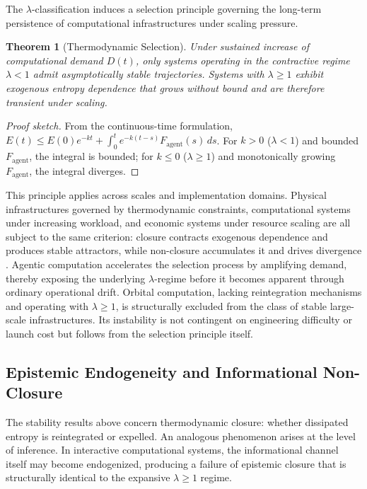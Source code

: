 \documentclass[11pt,a4paper]{article}
\theoremstyle{plain}
\newtheorem{theorem}{Theorem}
\theoremstyle{definition}
\theoremstyle{remark}
\begin{document}
The $\lambda$-classification induces a selection principle governing the
long-term persistence of computational infrastructures under scaling pressure.

\begin{theorem}[Thermodynamic Selection]
\label{thm:selection2}
Under sustained increase of computational demand $D(t)$, only systems operating
in the contractive regime $\lambda < 1$ admit asymptotically stable trajectories.
Systems with $\lambda \geq 1$ exhibit exogenous entropy dependence that grows
without bound and are therefore transient under scaling.
\end{theorem}

\begin{proof}[Proof sketch]
From the continuous-time formulation, $E(t) \leq E(0)e^{-kt} + \int_0^t
e^{-k(t-s)}F_{\mathrm{agent}}(s)\,ds$. For $k > 0$ ($\lambda < 1$) and bounded
$F_{\mathrm{agent}}$, the integral is bounded; for $k \leq 0$ ($\lambda \geq 1$)
and monotonically growing $F_{\mathrm{agent}}$, the integral diverges.
\end{proof}

This principle applies across scales and implementation domains. Physical
infrastructures governed by thermodynamic constraints, computational systems
under increasing workload, and economic systems under resource scaling are all
subject to the same criterion: closure contracts exogenous dependence and
produces stable attractors, while non-closure accumulates it and drives
divergence \citep{georgescu1971,garrett2011,ayres1998}. Agentic computation
accelerates the selection process by amplifying demand, thereby exposing the
underlying $\lambda$-regime before it becomes apparent through ordinary
operational drift. Orbital computation, lacking reintegration mechanisms and
operating with $\lambda \geq 1$, is structurally excluded from the class of
stable large-scale infrastructures. Its instability is not contingent on
engineering difficulty or launch cost but follows from the selection principle
itself.

\subsection{Epistemic Endogeneity and Informational Non-Closure}

The stability results above concern thermodynamic closure: whether dissipated
entropy is reintegrated or expelled. An analogous phenomenon arises at the level
of inference. In interactive computational systems, the informational channel
itself may become endogenized, producing a failure of epistemic closure that is
structurally identical to the expansive $\lambda \geq 1$ regime.
\end{document}
